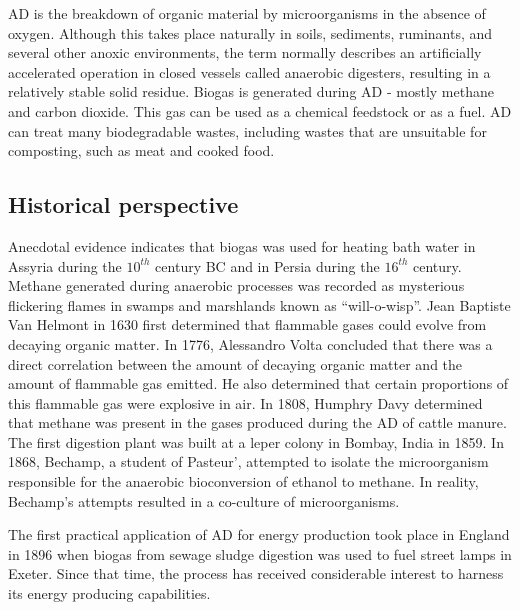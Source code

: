 \documentclass[fontsize=12pt,headsepline=true, bibliography=totocnumbered, twoside]{scrbook} %
\begin{document}

\ac{AD} is the breakdown of organic material by microorganisms in the absence of oxygen. Although this takes place naturally in soils, sediments, ruminants, and several other anoxic environments, the term normally describes an artificially accelerated operation in closed vessels called anaerobic digesters, resulting in a relatively stable solid residue. Biogas is generated during \ac{AD} - mostly methane and carbon dioxide. This gas can be used as a chemical feedstock or as a fuel. \ac{AD} can treat many biodegradable wastes, including wastes that are unsuitable for composting, such as meat and cooked food\citep{nayono}.



\subsection{Historical perspective}

Anecdotal evidence indicates that biogas was used for heating bath water in Assyria during the
$10^{th}$ century BC and in Persia during the $16^{th}$ century. Methane generated during anaerobic processes was recorded as mysterious flickering flames in swamps and marshlands known as ``will-o-wisp''. Jean Baptiste Van Helmont in 1630 first determined that flammable gases could evolve from decaying organic matter. In 1776, Alessandro Volta concluded that there was a direct correlation between the amount of decaying organic matter and the amount of flammable gas emitted. He also determined that certain proportions of this flammable gas were explosive in air. In 1808, Humphry Davy determined that methane was present in the gases produced during the \ac{AD} of cattle manure. The first digestion plant was built at a leper colony in Bombay, India in 1859. In 1868, Bechamp, a student of Pasteur', attempted to isolate the microorganism responsible for the anaerobic bioconversion of ethanol to methane. In reality, Bechamp's attempts resulted in a co-culture of microorganisms.

The first practical application of \ac{AD} for energy production took place in England in 1896 when biogas from sewage sludge digestion was used to fuel street lamps in Exeter. Since that time, the process has received considerable interest to harness its energy producing capabilities\citep{lusk96, lusk98, abbasi12}.
\end{document}
